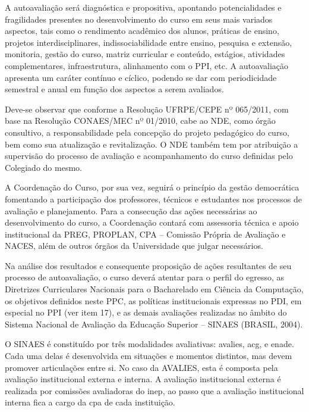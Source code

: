 \documentclass[
	12pt,				%
	openright,			%
  oneside,     %
	a4paper,			%
 hyphens,
	chapter=TITLE,		%
	english,			%
	french,				%
	spanish,			%
	brazil				%
	]{abntex2}
\begin{document}
A autoavaliação será diagnóstica e propositiva, apontando potencialidades e fragilidades presentes no desenvolvimento do curso em seus mais variados aspectos, tais como o rendimento acadêmico dos alunos, práticas de ensino, projetos interdisciplinares, indissociabilidade entre ensino, pesquisa e extensão, monitoria, gestão do curso, matriz curricular e conteúdo, estágios, atividades complementares, infraestrutura, alinhamento com o PPI, etc. A autoavaliação apresenta um caráter contínuo e cíclico, podendo se dar com periodicidade semestral e anual em função dos aspectos a serem avaliados.

Deve-se observar que conforme a Resolução UFRPE/CEPE nº 065/2011, com base na Resolução CONAES/MEC nº 01/2010, cabe ao NDE, como órgão consultivo, a responsabilidade pela concepção do projeto pedagógico do curso, bem como sua atualização e revitalização. O NDE também tem por atribuição a supervisão do processo de avaliação e acompanhamento do curso definidas pelo Colegiado do mesmo.

A Coordenação do Curso, por sua vez, seguirá o princípio da gestão democrática fomentando a participação dos professores, técnicos e estudantes nos processos de avaliação e planejamento. Para a consecução das ações necessárias ao desenvolvimento do curso, a Coordenação contará com assessoria técnica e apoio institucional da PREG, PROPLAN, CPA – Comissão Própria de Avaliação e NACES, além de outros órgãos da Universidade que julgar necessários.

Na análise dos resultados e consequente proposição de ações resultantes de seu processo de autoavaliação, o curso deverá atentar para o perfil do egresso, as Diretrizes Curriculares Nacionais para o Bacharelado em Ciência da Computação, os objetivos definidos neste PPC, as políticas institucionais expressas no PDI, em especial no PPI (ver item 17), e as demais avaliações realizadas no âmbito do Sistema Nacional de Avaliação da Educação Superior – SINAES (BRASIL, 2004).

O SINAES é constituído por três modalidades avaliativas: \acrfull{avalies}, \acrfull{acg}, e \acrshort{enade}. Cada uma delas é desenvolvida em situações e momentos distintos, mas devem promover articulações entre si. No caso da AVALIES, esta é composta pela avaliação institucional externa e interna. A avaliação institucional externa é realizada por comissões avaliadoras do \acrshort{inep}, ao passo que a avaliação institucional interna fica a cargo da \acrfull{cpa} de cada instituição.
\end{document}
